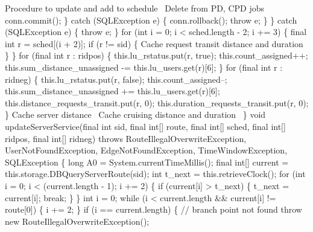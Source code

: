       \LA{}Procedure to update and add to schedule~{\nwtagstyle{}}\RA{}
      \LA{}Delete from PD, CPD jobs~{\nwtagstyle{}}\RA{}
      conn.commit();
    \} catch (SQLException e) \{
      conn.rollback();
      throw e;
    \}
  \} catch (SQLException e) \{
    throw e;
  \}
\eatline
{}\nwendcode{}\plusendmoddef
  for (int i = 0; i < sched.length - 2; i += 3) \{
    final int r = sched[(i + 2)];
    if (r != sid) \{
      \LA{}Cache request transit distance and duration~{\nwtagstyle{}}\RA{}
    \}
  \}
  for (final int r : ridpos) \{
    this.lu_rstatus.put(r, true);
    this.count_assigned++;
    this.sum_distance_unassigned -= this.lu_users.get(r)[6];
  \}
  for (final int r : ridneg) \{
    this.lu_rstatus.put(r, false);
    this.count_assigned--;
    this.sum_distance_unassigned += this.lu_users.get(r)[6];
    this.distance_requests_transit.put(r, 0);
    this.duration_requests_transit.put(r, 0);
  \}
  \LA{}Cache server distance~{\nwtagstyle{}}\RA{}
  \LA{}Cache cruising distance and duration~{\nwtagstyle{}}\RA{}
\}
\nwendcode{}\nwdocspar
\nwenddocs{}\endmoddef{}
void updateServerService(final int sid, final int[] route, final int[] sched,
    final int[] ridpos, final int[] ridneg)
throws RouteIllegalOverwriteException, UserNotFoundException,
       EdgeNotFoundException, TimeWindowException, SQLException \{
  long A0 = System.currentTimeMillis();
  final int[] current = this.storage.DBQueryServerRoute(sid);
  int t_next = this.retrieveClock();
  for (int i = 0; i < (current.length - 1); i += 2) \{
    if (current[i] > t_next) \{
      t_next = current[i];
      break;
    \}
  \}
  int i = 0;
  while (i < current.length && current[i] != route[0]) \{
    i += 2;
  \}
  if (i == current.length) \{
    // branch point not found
    throw new RouteIllegalOverwriteException();
